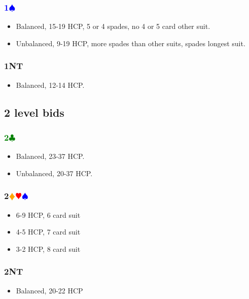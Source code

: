 \documentclass{article}
\newcommand{\Hs}{\textcolor{Red}{$\varheart$}}
\newcommand{\Ss}{\textcolor{Blue}{$\spadesuit$}}
\newcommand{\Ds}{\textcolor{Orange}{$\vardiamond$}}
\newcommand{\Cs}{\textcolor{Green}{$\clubsuit$}}
\newcommand{\NTs}{\textbf{\footnotesize{NT}}}
\renewcommand{\S}[1]{\textcolor{Blue}{\textbf{#1}\Ss}}
\newcommand{\C}[1]{\textcolor{Green}{\textbf{#1}\Cs}}
\newcommand{\NT}[1]{\textbf{#1\NTs}}
\newcommand{\notclubs}[1]{\textbf{#1}\Ds\Hs\Ss}
\begin{document}
\subsubsection{\S{1}}

\begin{itemize}
\item Balanced, 15-19 HCP, 5 or 4 spades, no 4 or 5 card other suit.
\item Unbalanced, 9-19 HCP, more spades than other suits, spades longest suit.
\end{itemize}

\subsubsection{\NT{1}}

\begin{itemize}
\item Balanced, 12-14 HCP.
\end{itemize}

\subsection{2 level bids}

\subsubsection{\C{2}}

\begin{itemize}
\item Balanced, 23-37 HCP.
\item Unbalanced, 20-37 HCP.
\end{itemize}

\subsubsection{\notclubs{2}}

\begin{itemize}
\item 6-9 HCP, 6 card suit
\item 4-5 HCP, 7 card suit
\item 3-2 HCP, 8 card suit
\end{itemize}

\subsubsection{\NT{2}}

\begin{itemize}
\item Balanced, 20-22 HCP
\end{itemize}
\end{document}
